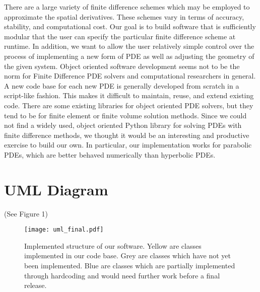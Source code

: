 \documentclass{article}
\begin{document}
	There are a large variety of finite difference schemes which may be employed to approximate the spatial derivatives. These schemes vary in terms of accuracy, stability, and computational cost. Our goal is to build software that is sufficiently modular that the user can specify the particular finite difference scheme at runtime. In addition, we want to allow the user relatively simple control over the process of implementing a new form of PDE as well as adjusting the geometry of the given system. Object oriented software development seems not to be the norm for Finite Difference PDE solvers and computational researchers in general. A new code base for each new PDE is generally developed from scratch in a script-like fashion. This makes it difficult to maintain, reuse, and extend existing code. There are some existing libraries for object oriented PDE solvers, but they tend to be for finite element or finite volume solution methods. Since we could not find a widely used, object oriented Python library for solving PDEs with finite difference methods, we thought it would be an interesting and productive exercise to build our own. In particular, our implementation works for parabolic PDEs, which are better behaved numerically than hyperbolic PDEs.


	\section{UML Diagram}
		(See Figure 1)
		\begin{figure}[h!]
			\centering
			\texttt{[image: uml\_final.pdf]}
			\caption{Implemented structure of our software. Yellow are classes implemented in our code base. Grey are classes which have not yet been implemented. Blue are classes which are partially implemented through hardcoding and would need further work before a final release.}
		\end{figure}
\end{document}
